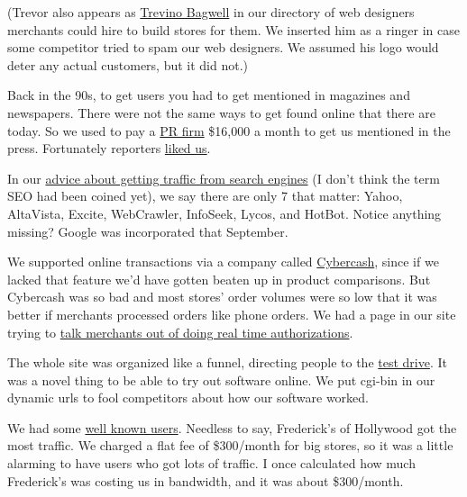 (Trevor also appears as
                  \href{http://ycombinator.com/viaweb/tlbwebdesign.html}{Trevino Bagwell}
                  in our directory of web designers merchants could hire to
                  build stores for them. We inserted him as a ringer in case
                  some competitor tried to spam our web designers. We assumed
                  his logo would deter any actual customers, but it did not.)

Back
                  in the 90s, to get users you had to get mentioned in magazines
                  and newspapers. There were not the same ways to get found
                  online that there are today. So we used to pay a
                  \href{http://www.paulgraham.com/submarine.html}{PR firm} \$16,000 a month to get us
                  mentioned in the press. Fortunately reporters
                  \href{http://ycombinator.com/viaweb/presquot.html}{liked us}.

In our
                  \href{http://ycombinator.com/viaweb/se.html}{advice about getting traffic from search engines}
                  (I don't think the term SEO had been coined yet), we say there
                  are only 7 that matter: Yahoo, AltaVista, Excite, WebCrawler,
                  InfoSeek, Lycos, and HotBot. Notice anything missing? Google
                  was incorporated that September.

We supported
                  online transactions via a company called
                  \href{http://en.wikipedia.org/wiki/CyberCash,\_Inc.}{Cybercash}, since if we lacked that feature we'd have gotten beaten up
                  in product comparisons. But Cybercash was so bad and most
                  stores' order volumes were so low that it was better if
                  merchants processed orders like phone orders. We had a page in
                  our site trying to
                  \href{http://www.ycombinator.com/viaweb/cybercash.html}{talk merchants out of doing real time authorizations}.

The whole site was organized like a funnel,
                  directing people to the
                  \href{http://ycombinator.com/viaweb/tesdriv.html}{test drive}. It was a novel thing to be able to try out software online.
                  We put cgi-bin in our dynamic urls to fool competitors about
                  how our software worked.

We had some
                  \href{http://ycombinator.com/viaweb/us.html}{well known users}. Needless to say, Frederick's of Hollywood got the most
                  traffic. We charged a flat fee of \$300/month for big stores,
                  so it was a little alarming to have users who got lots of
                  traffic. I once calculated how much Frederick's was costing us
                  in bandwidth, and it was about \$300/month.

